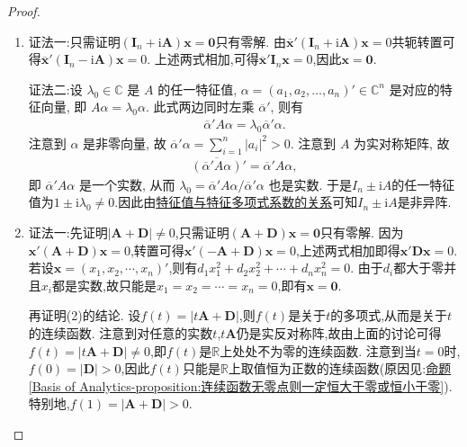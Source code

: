 \documentclass[../../main.tex]{subfiles}
\begin{document}
\begin{proof}
\begin{enumerate}[(1)]
\item {\color{blue}证法一:}只需证明\((\boldsymbol{I}_n + \mathrm{i}\boldsymbol{A})\boldsymbol{x}=\boldsymbol{0}\)只有零解. 由\(\overline{\boldsymbol{x}}'(\boldsymbol{I}_n + \mathrm{i}\boldsymbol{A})\boldsymbol{x}=0\)共轭转置可得\(\overline{\boldsymbol{x}}'(\boldsymbol{I}_n - \mathrm{i}\boldsymbol{A})\boldsymbol{x}=0\). 上述两式相加,可得\(\overline{\boldsymbol{x}}'\boldsymbol{I}_n\boldsymbol{x}=0\),因此\(\boldsymbol{x}=\boldsymbol{0}\).

{\color{blue}证法二:}设 $\lambda_0 \in \mathbb{C}$ 是 $A$ 的任一特征值, $\alpha = (a_1, a_2, \dots, a_n)' \in \mathbb{C}^n$ 是对应的特征向量, 即 $A\alpha = \lambda_0 \alpha$. 此式两边同时左乘 $\overline{\alpha }' $, 则有
\begin{align*}
\overline{\alpha }'  A \alpha = \lambda_0 \overline{\alpha }'  \alpha.
\end{align*}
注意到 $\alpha$ 是非零向量, 故 $\overline{\alpha }' \alpha = \sum_{i=1}^n |a_i|^2 > 0$. 注意到 $A$ 为实对称矩阵, 故
\begin{align*}
\overline{(\overline{\alpha }'  A\alpha )}' = \overline{\alpha }' A \alpha,
\end{align*}
即 $\overline{\alpha }'  A \alpha$ 是一个实数, 从而 $\lambda_0 = \overline{\alpha }'  A \alpha / \overline{\alpha }'  \alpha$ 也是实数. 于是$I_n\pm \mathrm{i}A$的任一特征值为$1\pm \mathrm{i}\lambda_0\ne 0$.因此由\hyperref[proposition:特征值与特征多项式系数的关系]{特征值与特征多项式系数的关系}可知$I_n\pm \mathrm{i}A$是非异阵.

\item {\color{blue}证法一:}先证明\(|\boldsymbol{A}+\boldsymbol{D}|\neq0\),只需证明\((\boldsymbol{A}+\boldsymbol{D})\boldsymbol{x}=\boldsymbol{0}\)只有零解. 因为\(\boldsymbol{x}'(\boldsymbol{A}+\boldsymbol{D})\boldsymbol{x}=0\),转置可得\(\boldsymbol{x}'(-\boldsymbol{A}+\boldsymbol{D})\boldsymbol{x}=0\),上述两式相加即得\(\boldsymbol{x}'\boldsymbol{D}\boldsymbol{x}=0\). 若设\(\boldsymbol{x}=(x_1,x_2,\cdots,x_n)'\),则有\(d_1x_1^2 + d_2x_2^2+\cdots + d_nx_n^2 = 0\). 由于\(d_i\)都大于零并且\(x_i\)都是实数,故只能是\(x_1 = x_2=\cdots = x_n = 0\),即有\(\boldsymbol{x}=\boldsymbol{0}\).

再证明(2)的结论. 设\(f(t)=|t\boldsymbol{A}+\boldsymbol{D}|\),则\(f(t)\)是关于\(t\)的多项式,从而是关于\(t\)的连续函数. 注意到对任意的实数\(t\),\(t\boldsymbol{A}\)仍是实反对称阵,故由上面的讨论可得\(f(t)=|t\boldsymbol{A}+\boldsymbol{D}|\neq0\),即\(f(t)\)是\(\mathbb{R}\)上处处不为零的连续函数. 注意到当\(t = 0\)时,\(f(0)=|\boldsymbol{D}|>0\),因此\(f(t)\)只能是\(\mathbb{R}\)上取值恒为正数的连续函数(原因见:\hyperref[Basis of Analytics-proposition:连续函数无零点则一定恒大于零或恒小于零]{命题\ref{Basis of Analytics-proposition:连续函数无零点则一定恒大于零或恒小于零}}).特别地,\(f(1)=|\boldsymbol{A}+\boldsymbol{D}|>0\). 


\end{enumerate}
\end{proof}
\end{document}
